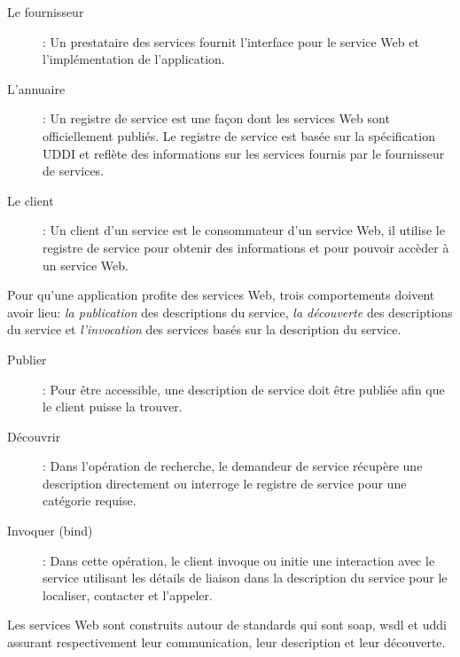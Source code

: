 

\renewcommand{\descriptionlabel}[1]{\hspace{1cm}\textbullet~\textsf{#1}}
\begin{description}
\item[Le fournisseur]: Un prestataire des services fournit l'interface
  pour le service Web et l'implémentation de l'application.

\item[L'annuaire]: Un registre de service est une façon dont les
  services Web sont officiellement publiés. Le registre de service est
  basée sur la spécification \textsc{UDDI} et reflète des informations
  sur les services fournis par le fournisseur de services.

\item[Le client]: Un client d'un service est le consommateur d'un
  service Web, il utilise le registre de service pour obtenir des
  informations et pour pouvoir accèder à un service Web.
\end{description}

Pour qu'une application profite des services Web, trois comportements
doivent avoir lieu: \textit{la publication} des descriptions du
service, \textit{la découverte} des descriptions du service et
\textit{l'invocation} des services basés sur la description du
service.

\renewcommand{\descriptionlabel}[1]{\hspace{1cm}\textbullet~\textsf{#1}}
\begin{description}
\item[Publier]: Pour être accessible, une description de service doit
  être publiée afin que le client puisse la trouver.

\item[Découvrir]: Dans l'opération de recherche, le demandeur de
  service récupère une description directement ou interroge
  le registre de service pour une catégorie requise.

\item[Invoquer (bind)]: Dans cette opération, le client invoque ou
  initie une interaction avec le service utilisant les détails de
  liaison dans la description du service pour le localiser, contacter
  et l'appeler.
\end{description}

Les services Web sont construits autour de standards qui sont
\acrshort{soap}, \acrshort{wsdl} et \acrshort{uddi} assurant
respectivement leur communication, leur description et leur
découverte.

